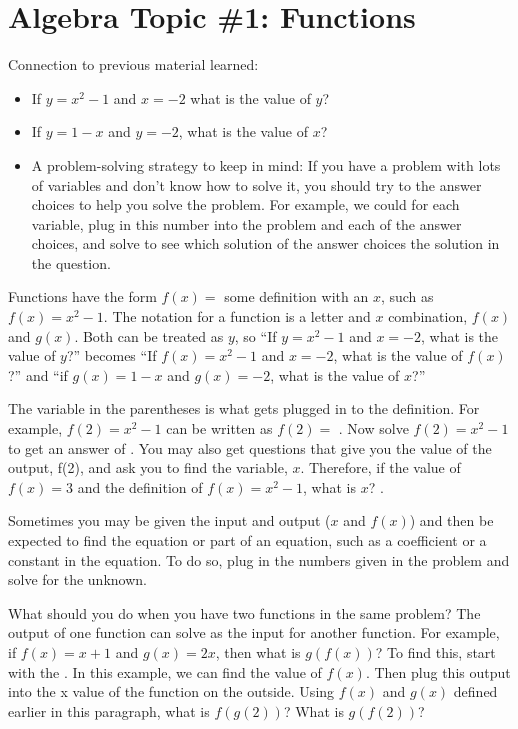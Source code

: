 \documentclass[12pt]{book}
\newcommand{\longline}{\underline{\hspace{2in}} }
\begin{document}
\newpage
\section[Functions]{Algebra Topic \#1: Functions}

Connection to previous material learned:

\begin{itemize}
\item If $y=x^2-1$ and $x=-2$ what is the value of $y$? \longline
\item If $y=1-x$ and $y=-2$, what is the value of $x$? \longline
\item A problem-solving strategy to keep in mind: If you have a problem with lots of variables and don't know how to solve it, you should try to \longline the answer choices to help you solve the problem. For example, we could \longline for each variable, plug in this number into the problem and each of the answer choices, and solve to see which solution of the answer choices \longline the solution in the question.
\end{itemize}

\vfill
Functions have the form $f(x)=$ some definition with an $x$, such as $f(x)=x^2-1$. The notation for a function is a letter and $x$ combination, $f(x)$ and $g(x)$. Both can be treated as $y$, so ``If $y=x^2-1$ and $x=-2$, what is the value of $y$?” becomes ``If $f(x)=x^2-1$ and $x=-2$, what is the value of $f(x)$?'' and ``if $g(x)=1-x$ and $g(x)=-2$, what is the value of $x$?'' \longline

\vfill
The variable in the parentheses is what gets plugged in to the definition. For example, $f(2)=x^2-1$ can be written as $f(2)=$\longline. Now solve $f(2)=x^2-1$ to get an answer of \longline. You may also get questions that give you the value of the output, f(2), and ask you to find the variable, $x$. Therefore, if the value of $f(x)=3$ and the definition of $f(x)=x^2-1$, what is $x$? \longline.

\vfill
Sometimes you may be given the input and output ($x$ and $f(x)$) and then be expected to find the equation or part of an equation, such as a coefficient or a constant in the equation. To do so, plug in the numbers given in the problem and solve for the unknown.

\vfill
What should you do when you have two functions in the same problem? The output of one function can solve as the input for another function. For example, if $f(x)=x+1$ and $g(x)=2x$, then what is $g(f(x))$? To find this, start with the \longline. In this example, we can find the value of $f(x)$. Then plug this output into the x value of the function on the outside. Using $f(x)$ and $g(x)$ defined earlier in this paragraph, what is $f(g(2))$? What is $g(f(2))$? \longline
\end{document}
